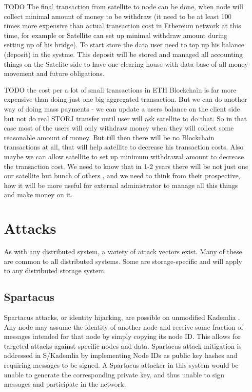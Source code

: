 \documentclass[11pt,fleqn,openany]{book}
\newcommand{\todo}[1]{{\color{red} TODO #1 }}
\begin{document}
\todo{
The final transaction from satellite to node can be done, when node will collect minimal amount of money to be withdraw (it need to be at least 100 times more expensive than actual transaction cost in Ethereum network at this time, for example or Satellite can set up minimal withdraw amount during setting up of his bridge).
To start store the data user need to top up his balance (deposit) in the systme. This deposit will be stored and managed all accounting things on the Satelite side to have one clearing house with data base of all money movement and future obligations.
}

\todo{the cost per a lot of small transactions in ETH Blockchain is far more expensive than doing just one big aggregated transaction.
But we can do another way of doing mass payments - we can update a users balance on the client side but not do real STORJ transfer until user will ask satellite to do that. So in that case most of the users will only withdraw money when they will collect some reasonable amount of money. But till then there will be no Blockchain transactions at all, that will help satellite to decrease his transaction costs. Also maybe we can allow satellite to set up minimum withdrawal amount to decrease the transaction cost.
We need to know that in 1-2 years there will be not just one our satellite but bunch of others , and we need to think from their prospective, how it will be more useful for external administrator to manage all this things and make money on it.
}
\newpage \appendix

\chapter{Attacks}

As with any distributed system, a variety of attack vectors exist. Many of these
are common to all distributed systems. Some are storage-specific and will apply
to any distributed storage system.

\section{Spartacus}

Spartacus attacks, or identity hijacking, are possible on unmodified Kademlia
\cite{kad}.
Any node may assume the identity of another node and receive some fraction of
messages intended for that node by simply copying its node ID.
This allows for targeted attacks against specific nodes and data.
Spartacus attack mitigation is addressed in S/Kademlia \cite{skad} by
implementing Node IDs as public key hashes and requiring messages to be signed.
A Spartacus attacker in this system would be unable to generate the
corresponding private key, and thus unable to sign messages and participate in
the network.
\end{document}
